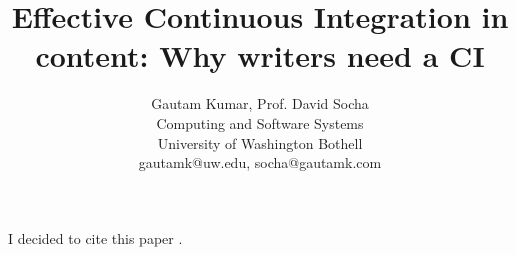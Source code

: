 \documentclass[10pt,conference]{IEEEtran}
\begin{document}
\title{Effective Continuous Integration in content: \newline Why writers need 
a CI}


\author{
{\rm Gautam Kumar, Prof. David Socha}\\
Computing and Software Systems\\
University of Washington Bothell\\
gautamk@uw.edu, socha@gautamk.com
} %

\maketitle
\thispagestyle{empty}


I decided to cite this paper \cite{lin_why_2016} .



\end{document}
